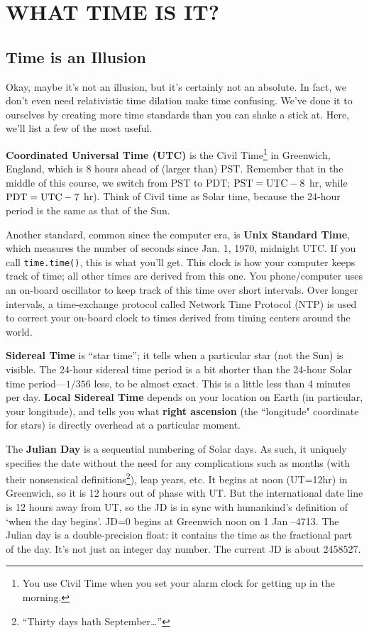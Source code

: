 \documentclass[12pt,preprint]{aastex}
\begin{document}
\section{WHAT TIME IS IT?} \label{jultime}

\subsection{Time is an Illusion}

Okay, maybe it's not an illusion, but it's certainly not an absolute.
In fact, we don't even need relativistic time dilation make time confusing.
We've done it to ourselves by creating more time standards than you can
shake a stick at.  Here, we'll list a few of the most useful.

{\bf Coordinated Universal Time (UTC)} is the Civil Time\footnote{You use
  Civil Time when you set your alarm clock for getting up in the
  morning.} in Greenwich, England, which is 8 hours ahead of (larger
than) PST. Remember that in the middle of this course, we switch from
PST to PDT; ${\rm PST}={\rm UTC} - 8$ hr, while ${\rm PDT}={\rm UTC} - 7$ hr). Think of Civil time
as Solar time, because the 24-hour period is the same as that of the
Sun.

Another standard, common since the computer era, is {\bf Unix Standard Time}, which measures the
number of seconds since Jan. 1, 1970, midnight UTC. If you call {\tt time.time()}, this
is what you'll get.  This clock is how your computer keeps track of time; all other times
are derived from this one.  You phone/computer uses an on-board oscillator to keep track of 
this time over short intervals.  Over longer intervals, a time-exchange protocol called 
Network Time Protocol (NTP) is used to correct your on-board clock to times derived from timing
centers around the world.

{\bf Sidereal Time} is ``star time''; it tells when a
particular star (not the Sun) is visible. The 24-hour sidereal time period is a
bit shorter than the 24-hour Solar time period---$1/356$ less, to
be almost exact. This is a little less than 4 minutes per day.  {\bf Local Sidereal Time}
depends on your location on Earth (in particular, your longitude), and tells you
what {\bf right ascension} (the ``longitude" coordinate for stars) is directly overhead
at a particular moment.

The {\bf Julian Day} is a sequential numbering of Solar days. As such, it
uniquely specifies the date without the need for any complications such
as months (with their nonsensical definitions\footnote{``Thirty days
  hath September\dots''}), leap years, etc. It begins at noon (UT=12hr)
in Greenwich, so it is 12 hours out of phase with UT. But the
international date line is 12 hours away from UT, so the JD is in sync
with humankind's definition of `when the day begins'. JD=0 begins at
Greenwich noon on 1 Jan --4713.  The Julian day is a double-precision
float: it contains the time as the fractional part of the day. It's not
just an integer day number. The current JD is about 
2458527. %
\end{document}
